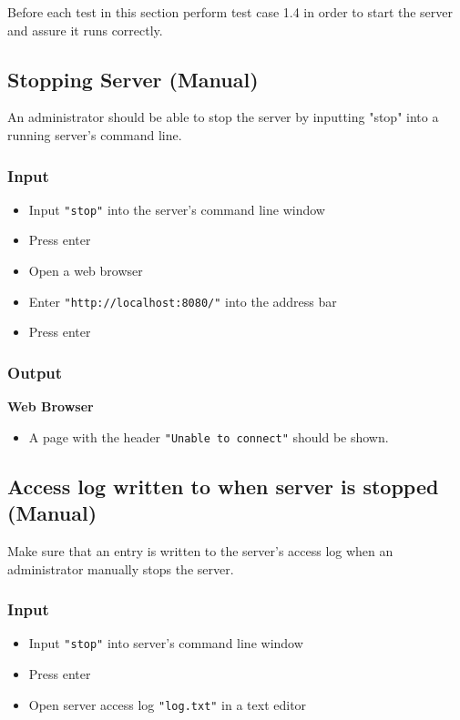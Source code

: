 \documentclass[a4paper, 12pt]{article}
\begin{document}
Before each test in this section perform test case 1.4 in order to start the server and assure it runs correctly.

\subsection{Stopping Server (Manual)}

An administrator should be able to stop the server by inputting "stop" into a running server's command line.

\subsubsection{Input}
\begin{itemize}
\item Input \texttt{"stop"} into the server's command line window 
\item Press enter
\item Open a web browser
\item Enter \texttt{"http://localhost:8080/"} into the address bar
\item Press enter
\end{itemize}

\subsubsection{Output}
\textbf{Web Browser}
\begin{itemize}
\item A page with the header \texttt{"Unable to connect"} should be shown.
\end{itemize}


\subsection{Access log written to when server is stopped (Manual)}

Make sure that an entry is written to the server's access log when an administrator manually stops the server.

\subsubsection{Input}
\begin{itemize}
\item Input \texttt{"stop"} into server's command line window 
\item Press enter
\item Open server access log \texttt{"log.txt"} in a text editor
\end{itemize}
\end{document}
